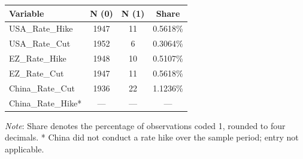 \begin{tabular}{lccc}
  \toprule
  \textbf{Variable} & \textbf{N (0)} & \textbf{N (1)} & \textbf{Share} \\ 
  \midrule
  USA\_Rate\_Hike & 1947 & 11 & 0.5618\% \\ 
  USA\_Rate\_Cut & 1952 & 6 & 0.3064\% \\ 
  EZ\_Rate\_Hike & 1948 & 10 & 0.5107\% \\ 
  EZ\_Rate\_Cut & 1947 & 11 & 0.5618\% \\ 
  China\_Rate\_Cut & 1936 & 22 & 1.1236\% \\ 
  China\_Rate\_Hike* & — & — & — \\ 
  \bottomrule
\end{tabular}
\par\vspace{4pt}
\begin{minipage}{\linewidth}
  \footnotesize \textit{Note}: Share denotes the percentage of observations coded 1, rounded to four decimals. * China did not conduct a rate hike over the sample period; entry not applicable.
\end{minipage}